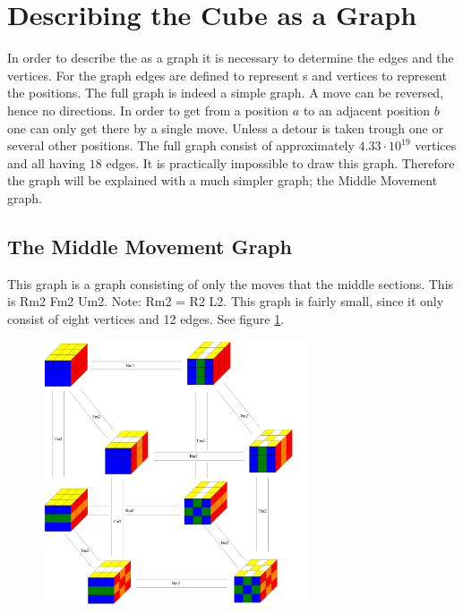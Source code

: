\section{Describing the Cube as a Graph}
In order to describe the \rubik{} as a graph it is necessary to determine the edges and the vertices. For the \rubik{} graph edges are defined to represent \twist{}s and vertices to represent the positions. 
The full \rubik{} graph is indeed a simple graph. A move can be reversed, hence no directions. In order to get from a position $a$ to an adjacent position $b$ one can only get there by a single move. 
Unless a detour is taken trough one or several other positions. 
The full \rubik{} graph consist of approximately $4.33\cdot10^{19}$ vertices and all having $18$ edges.
It is practically impossible to draw this graph. Therefore the graph will be explained with a much simpler graph; the Middle Movement graph.


\subsection{The Middle Movement Graph}
\label{sub:middleMoveGraph}
This graph is a \rubik{} graph consisting of only the moves that \twist{} the middle sections. 
This is Rm2 Fm2 Um2. Note: Rm2 = R2 L2.  This graph is fairly small, since it only consist of eight vertices and 12 edges. See figure \ref{fig:graphMiddleSlice2}. \cite[pp. 158-167]{Rubik87}

\begin{figure}[bht!]
	\centering
		\includegraphics[width = 0.7\textwidth]{input/pics/graphMiddleSlice2.PNG}
	\caption{}
	\label{fig:graphMiddleSlice2}
\end{figure}

